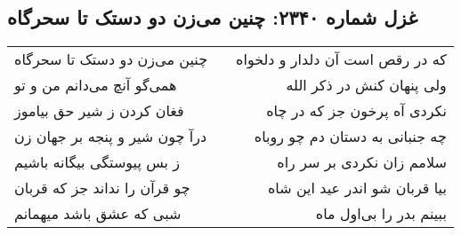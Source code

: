 \begin{center}
\section*{غزل شماره ۲۳۴۰: چنین می‌زن دو دستک تا سحرگاه}
\label{sec:2340}
\begin{longtable}{l p{0.5cm} r}
چنین می‌زن دو دستک تا سحرگاه
&&
که در رقص است آن دلدار و دلخواه
\\
همی‌گو آنچ می‌دانم من و تو
&&
ولی پنهان کنش در ذکر الله
\\
فغان کردن ز شیر حق بیاموز
&&
نکردی آه پرخون جز که در چاه
\\
درآ چون شیر و پنجه بر جهان زن
&&
چه جنبانی به دستان دم چو روباه
\\
ز بس پیوستگی بیگانه باشیم
&&
سلامم زان نکردی بر سر راه
\\
چو قرآن را نداند جز که قربان
&&
بیا قربان شو اندر عید این شاه
\\
شبی که عشق باشد میهمانم
&&
ببینم بدر را بی‌اول ماه
\\
\end{longtable}
\end{center}
